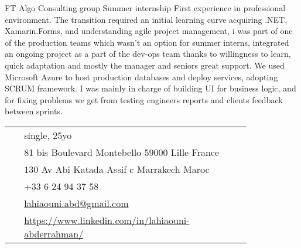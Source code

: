 \documentclass[10pt]{article} %
\begin{document}
\begin{paracol}{2}
{FT} %
{Algo Consulting group} %
{Summer internship} %
{First experience in professional environment. The transition required an initial learning curve acquiring .NET, Xamarin.Forms, and understanding agile project management, i was part of one of the production teams which wasn't an option for summer interns, integrated an ongoing project as a part of the dev-ops team thanks to willingness to learn, quick adaptation and mostly the manager and seniors great support. We used Microsoft Azure to host production databases and deploy services, adopting SCRUM framework. I was mainly in charge of building UI for business logic, and for fixing problems we get from testing engineers reports and clients feedback between sprints.}  %


\vspace{-\baselineskip}\medskip %

\medskip %


\switchcolumn %


\parbox[top][0.12\textheight][c]{\linewidth}{ %
	\vspace{-0.04\textheight} %
	\colorbox{shade}{ %
		\begin{supertabular}{p{0.05\linewidth}|p{0.775\linewidth}} %
			\raisebox{-1pt}{\faUser} & single, 25yo\\ %
			\raisebox{-1pt}{\faHome} & 81 bis Boulevard Montebello 59000 Lille France \\ %
			\raisebox{-1pt}{\faHome} & 130 Av Abi Katada Assif c Marrakech Maroc \\ %
			\raisebox{-1pt}{\faPhone} & +33 6 24 94 37 58 \\ %
			\raisebox{0pt}{\small\faEnvelope} & \href{mailto:lahiaouni.abd@gmail.com}{lahiaouni.abd@gmail.com} \\ %
			\raisebox{-1pt}{\faLinkedinSquare} & \href{https://www.linkedin.com/in/lahiaouni-abderrahman/}{https://www.linkedin.com/in/lahiaouni-abderrahman/} \\ %
		\end{supertabular}
	}
}


\end{paracol}
\end{document}
